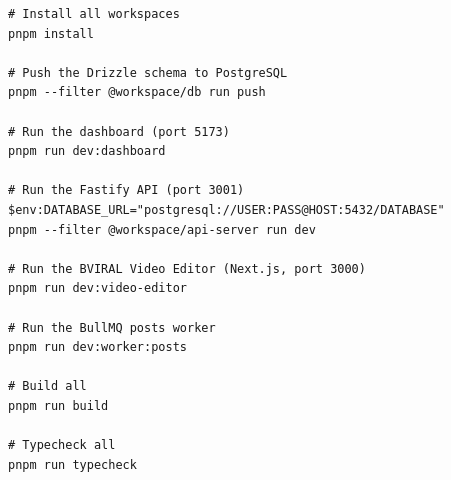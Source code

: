 \begin{lstlisting}[caption={Local development commands (PowerShell)},label={lst:cmds}]
# Install all workspaces
pnpm install

# Push the Drizzle schema to PostgreSQL
pnpm --filter @workspace/db run push

# Run the dashboard (port 5173)
pnpm run dev:dashboard

# Run the Fastify API (port 3001)
$env:DATABASE_URL="postgresql://USER:PASS@HOST:5432/DATABASE"
pnpm --filter @workspace/api-server run dev

# Run the BVIRAL Video Editor (Next.js, port 3000)
pnpm run dev:video-editor

# Run the BullMQ posts worker
pnpm run dev:worker:posts

# Build all
pnpm run build

# Typecheck all
pnpm run typecheck
\end{lstlisting}
